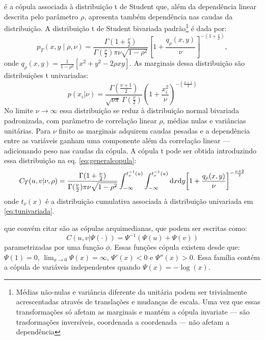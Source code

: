  é a cópula associada à distribuição t de Student que, além da dependência linear descrita pelo parâmetro $\rho$, apresenta também dependência nas caudas da distribuição. A distribuição t de Student bivariada padrão\footnote{Médias não-nulas e variância diferente da unitária podem ser trivialmente acrescentadas através de translações e mudanças de escala. Uma vez que essas transformações só afetam as marginais e mantém a cópula invariate --- são trasformações inversíveis, coordenada a coordenada --- não afetam a dependência} é dada por:
\begin{equation}
\label{eq:tbivariada}
p_{T}(x,y\mid  \rho, \nu) = \frac{\Gamma(1+\frac{\nu}{2})}{\Gamma(\frac{\nu}{2}){\pi\nu\sqrt{1-\rho^2}}}\left[1+ \frac{q_\rho(x,y)}{\nu}\right]^{-(1+\frac{\nu}{2})},
\end{equation}
onde $q_\rho(x,y) = \frac{1}{1-\rho^2}\left[x^2+ y^2 - 2\rho xy\right]$. As marginais dessa distribuição são distribuições t univariadas:
\begin{equation}
\label{eq:tunivariada}
 p(x_i|\nu) = \frac{\Gamma(\frac{\nu+1}{2})} {\sqrt{\nu\pi}\,\Gamma(\frac{\nu}{2})} \left(1+\frac{x_i^2}{\nu} \right)^{-(\frac{\nu+1}{2})}\!
\end{equation}
No limite $\nu \to \infty$ essa distribuição se reduz à distribuição normal bivariada padronizada, com parâmetro de correlação linear $\rho$, médias nulas e variâncias unitárias. Para $\nu$ finito as marginais adquirem caudas pesadas e a dependência entre as variáveis ganham uma componente além da correlação linear --- adicionando peso nas caudas da cópula. A cópula t pode ser obtida introduzindo essa distribuição na eq. \eqref{eq:generalcopula}:
\begin{equation}
 \label{eq:tcop}
C_{T}(u,v|\nu, \rho) = \frac{\Gamma(1+\frac{\nu}{2})}{\Gamma(\frac{\nu}{2}){\pi\nu\sqrt{1-\rho^2}}}
\int_{-\infty}^{t_\nu^{-1}(u)} \int_{-\infty}^{t_\nu^{-1}(u)} \ud x \ud y
{\left[1+ \frac{q_{\rho}(x,y)}{\nu}\right]^{-\frac{\nu+2}{2}}}
\end{equation}
onde $t_{\nu}(x)$ é a distribuição cumulativa associada à distribuição univariada em \eqref{eq:tunivariada}.

 que convém citar são as cópulas arquimedianas, que podem ser escritas como:
\begin{equation}
\label{eq:arqcop}
C(u,v | \Psi(\cdot)) = \Psi^{-1}\left(\Psi(u) + \Psi(v)\right)
\end{equation}
parametrizadas por uma função $\phi$. Essas funções cópula existem desde que: $\Psi(1) = 0$, $\lim_{x \to 0}\Psi(x) = \infty$, $\Psi'(x) < 0$ e $\Psi''(x) > 0$. Essa família contém a cópula de variáveis independentes quando $\Psi(x) = -\log(x)$.
